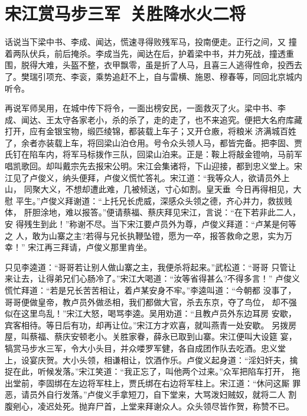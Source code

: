 \chapter{宋江赏马步三军~关胜降水火二将}

话说当下梁中书、李成、闻达，慌速寻得败残军马，投南便走。正行之间，又
撞着两队伏兵，前后掩杀。李成当先，闻达在后，护着梁中书，并力死战，撞透重
围，脱得大难，头盔不整，衣甲飘零，虽是折了人马，且喜三人逃得性命，投西去
了。樊瑞引项充、李衮，乘势追赶不上，自与雷横、施恩、穆春等，同回北京城内
听令。

再说军师吴用，在城中传下将令，一面出榜安民，一面救灭了火。梁中书、李
成、闻达、王太守各家老小，杀的杀了，走的走了，也不来追究。便把大名府库藏
打开，应有金银宝物，缎匹绫锦，都装载上车子；又开仓廒，将粮米济满城百姓
了，余者亦装载上车，将回梁山泊仓用。号令众头领人马，都皆完备。把李固、贾
氏钉在陷车内，将军马标拨作三队，回梁山泊来。正是：鞍上将敲金镫响，马前军
唱凯歌回。却叫戴宗先去报宋公明。宋江会集诸将，下山迎接，都到忠义堂上。宋
江见了卢俊义，纳头便拜，卢俊义慌忙答礼。宋江道：“我等众人，欲请员外上山，
同聚大义，不想却遭此难，几被倾送，寸心如割。皇天垂，今日再得相见，大慰
平生。”卢俊义拜谢道：“上托兄长虎威，深感众头领之德，齐心并力，救拔贱体，
肝胆涂地，难以报答。”便请蔡福、蔡庆拜见宋江，言说：“在下若非此二人，安
得残生到此！”称谢不尽。当下宋江要卢员外为尊，卢俊义拜道：“卢某是何等之
人，敢为山寨之主?若得与兄长执鞭坠镫，愿为一卒，报答救命之恩，实为万幸！”
宋江再三拜请，卢俊义那里肯坐。

只见李逵道：“哥哥若让别人做山寨之主，我便杀将起来。”武松道：“哥哥
只管让来让去，让得弟兄们心肠冷了。”宋江大喝道：“汝等省得甚么?不得多言！”
卢俊义慌忙拜道：“若是兄长苦苦相让，着卢某安身不牢。”李逵叫道：“今朝都
没事了，哥哥便做皇帝，教卢员外做丞相，我们都做大官，杀去东京，夺了鸟位，
却不强似在这里鸟乱！”宋江大怒，喝骂李逵。吴用劝道：“且教卢员外东边耳房
安歇，宾客相待。等日后有功，却再让位。”宋江方才欢喜，就叫燕青一处安歇。
另拨房屋，叫蔡福、蔡庆安顿老小。关胜家眷，薛永已取到山寨。宋江便叫大设筵
宴，犒赏马步水三军，令大小头目，并众喽罗军健，各自成团作队去吃酒。忠义堂
上，设宴庆贺。大小头领，相谦相让，饮酒作乐。卢俊义起身道：“淫妇奸夫，擒
捉在此，听候发落。”宋江笑道：“我正忘了，叫他两个过来。”众军把陷车打开，
拖出堂前，李固绑在左边将军柱上，贾氏绑在右边将军柱上。宋江道：“休问这厮
罪恶，请员外自行发落。”卢俊义手拿短刀，自下堂来，大骂泼妇贼奴，就将二人
割腹剜心，凌迟处死。抛弃尸首，上堂来拜谢众人。众头领尽皆作贺，称赞不已。

